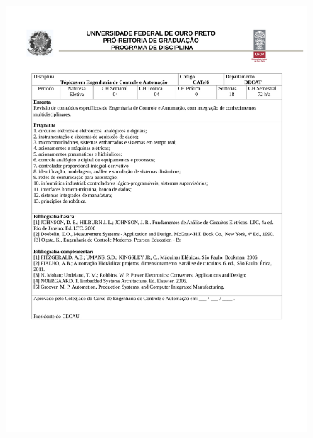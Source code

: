 \begin{figure}[p]
	\centering 
	\includegraphics[scale=0.7]{capitulos/anexo1-programas-disciplina/eg36.pdf}
\end{figure}

